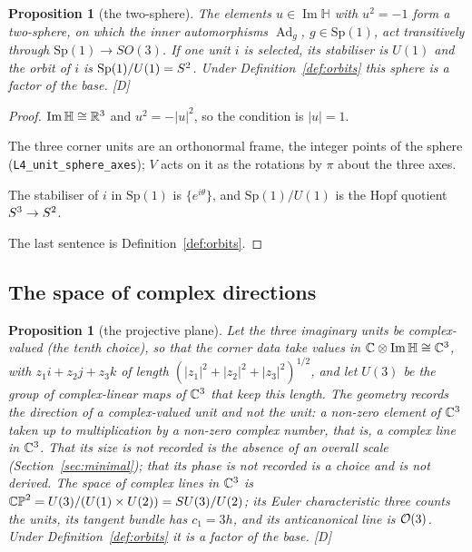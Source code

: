 \documentclass[11pt,a4paper]{article}
\theoremstyle{plain}
\newtheorem{proposition}[theorem]{Proposition}
\theoremstyle{definition}
\theoremstyle{remark}
\newcommand{\Hquat}{\mathbb{H}}
\newcommand{\ImH}{\operatorname{Im}\Hquat}
\newcommand{\Ad}{\operatorname{Ad}}
\newcommand{\rigD}{[\textup{D}]}
\begin{document}
\begin{proposition}[the two-sphere]\label{prop:S2}
The elements $u\in\ImH$ with $u^{2}=-1$ form a two-sphere, on which the inner automorphisms $\Ad_{g}$, $g\in\mathrm{Sp}(1)$, act transitively through $\mathrm{Sp}(1)\to SO(3)$. 
If one unit $i$ is selected, its stabiliser is $U(1)$ and the orbit of $i$ is $\mathrm{Sp}(1)/U(1)=S^2$.
 Under Definition~\ref{def:orbits} this sphere is a factor of the base. \rigD
\end{proposition}

\begin{proof}
$\ImH\cong\R^{3}$ and $u^{2}=-\lvert u\rvert^{2}$, so the condition is $\lvert u\rvert=1$.

The three corner units are an orthonormal frame, the integer points of the sphere (\texttt{L4\_unit\_sphere\_axes}); $V$ acts on it as the rotations by $\pi$ about the three axes.

The stabiliser of $i$ in $\mathrm{Sp}(1)$ is $\{e^{i\theta}\}$, and $\mathrm{Sp}(1)/U(1)$ is the Hopf quotient $S^{3}\to S^2$.

The last sentence is Definition~\ref{def:orbits}.
\end{proof}

\subsection{The space of complex directions}

\begin{proposition}[the projective plane]\label{prop:CP2}
Let the three imaginary units be complex-valued (the tenth choice), so that the corner data take values in $\C\otimes\ImH\cong\C^{3}$, with $z_{1}i+z_{2}j+z_{3}k$ of length $(\lvert z_{1}\rvert^{2}+\lvert z_{2}\rvert^{2}+\lvert z_{3}\rvert^{2})^{1/2}$, and let $U(3)$ be the group of complex-linear maps of $\mathbb{C}^{3}$ that keep this length. The geometry records the direction of a complex-valued unit and not the unit: a non-zero element of $\mathbb{C}^{3}$ taken up to multiplication by a non-zero complex number, that is, a complex line in $\mathbb{C}^{3}$. That its size is not recorded is the absence of an overall scale (Section~\ref{sec:minimal}); that its phase is not recorded is a choice and is not derived. The space of complex lines in $\mathbb{C}^{3}$ is $\mathbb{CP}^2=U(3)/(U(1)\times U(2))=SU(3)/U(2)$; its Euler characteristic three counts the units, its tangent bundle has $c_{1}=3h$, and its anticanonical line is $\mathcal{O}(3)$. Under Definition~\ref{def:orbits} it is a factor of the base. \rigD
\end{proposition}
\end{document}
